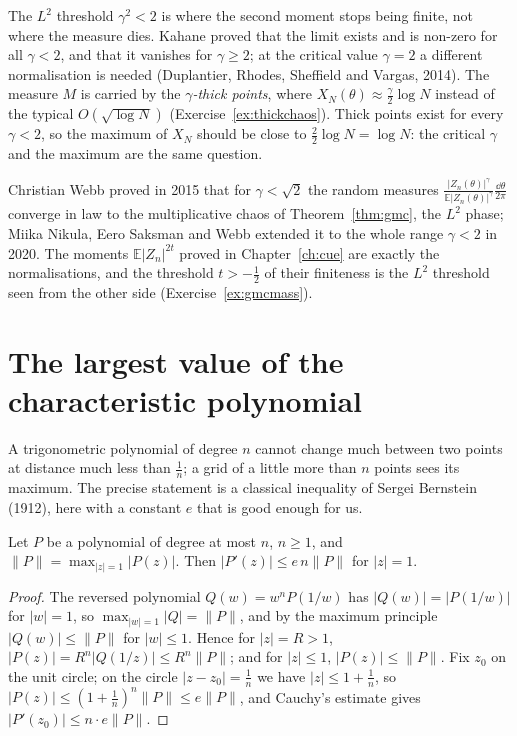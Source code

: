 The $L^2$ threshold $\gamma^2<2$ is where the second moment stops being finite, not where the measure dies. Kahane proved that the limit exists and is non-zero for all $\gamma<2$, and that it vanishes for $\gamma\ge2$; at the critical
value $\gamma=2$ a different normalisation is needed (Duplantier, Rhodes, Sheffield and Vargas, 2014). The measure $M$ is carried by the \emph{$\gamma$-thick points}, where $X_N(\theta)\approx\frac\gamma2\log N$ instead of the typical
$O(\sqrt{\log N})$ (Exercise~\ref{ex:thickchaos}). Thick points exist for every $\gamma<2$, so the maximum of $X_N$ should be close to $\frac22\log N=\log N$: the critical $\gamma$ and the maximum are the same question.

\begin{remark}
Christian Webb proved in 2015 that for $\gamma<\sqrt2$ the random measures $\frac{|Z_n(\theta)|^\gamma}{\mathbb E|Z_n(\theta)|^\gamma}\frac{\dd\theta}{2\pi}$ converge in law to the multiplicative chaos of Theorem~\ref{thm:gmc}, the $L^2$ phase; Miika Nikula, Eero Saksman
and Webb extended it to the whole range $\gamma<2$ in 2020. The moments $\mathbb E|Z_n|^{2t}$ proved in Chapter~\ref{ch:cue} are exactly the normalisations, and the threshold $t>-\frac12$ of their finiteness is the $L^2$ threshold seen
from the other side (Exercise~\ref{ex:gmcmass}).
\end{remark}

\section{The largest value of the characteristic polynomial}

A trigonometric polynomial of degree $n$ cannot change much between two points at distance much less than $\frac1n$; a grid of a little more than $n$ points sees its maximum. The precise statement is a classical inequality of
Sergei Bernstein (1912), here with a constant $e$ that is good enough for us.

\begin{lemma}\label{lem:bernstein}
Let $P$ be a polynomial of degree at most $n$, $n\ge1$, and $\|P\|=\max_{|z|=1}|P(z)|$. Then $|P'(z)|\le e\,n\|P\|$ for $|z|=1$.
\end{lemma}

\begin{proof}
The reversed polynomial $Q(w)=w^nP(1/w)$ has $|Q(w)|=|P(1/w)|$ for $|w|=1$, so $\max_{|w|=1}|Q|=\|P\|$, and by the maximum principle $|Q(w)|\le\|P\|$ for $|w|\le1$. Hence for $|z|=R>1$, $|P(z)|=R^n|Q(1/z)|\le R^n\|P\|$; and for $|z|\le1$,
$|P(z)|\le\|P\|$. Fix $z_0$ on the unit circle; on the circle $|z-z_0|=\frac1n$ we have $|z|\le1+\frac1n$, so $|P(z)|\le(1+\frac1n)^n\|P\|\le e\|P\|$, and Cauchy's estimate gives $|P'(z_0)|\le n\cdot e\|P\|$.
\end{proof}

